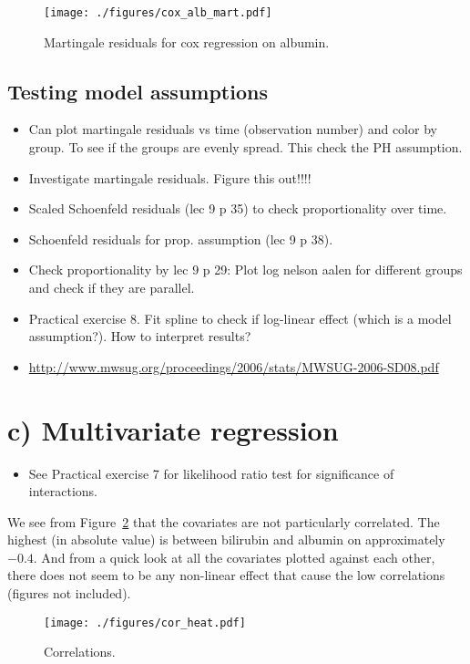 \documentclass[11pt,a4paper]{article}
\begin{document}
\begin{figure}[h!tb]
    \begin{center}
        \texttt{[image: ./figures/cox\_alb\_mart.pdf]}
    \end{center}
    \vspace{-0.2cm}
    \caption{Martingale residuals for cox regression on albumin.}
    \label{fig:cox_alb_mart}
\end{figure}


\subsection{Testing model assumptions}

\begin{itemize}
    \item Can plot martingale residuals vs time (observation number) and color by group. To see if the groups are evenly spread. This check the PH assumption.
    \item Investigate martingale residuals. Figure this out!!!!
    \item Scaled Schoenfeld residuals (lec 9 p 35) to check proportionality over time.
    \item Schoenfeld residuals for prop. assumption (lec 9 p 38).
    \item Check proportionality by lec 9 p 29: Plot log nelson aalen for different groups and check if they are parallel.
    \item Practical exercise 8. Fit spline to check if log-linear effect (which is a model assumption?). How to interpret results?
    \item \url{http://www.mwsug.org/proceedings/2006/stats/MWSUG-2006-SD08.pdf}
\end{itemize}



\section{c) Multivariate regression}
\begin{itemize}
    \item See Practical exercise 7 for likelihood ratio test for significance of interactions.
\end{itemize}


We see from Figure~\ref{fig:cor_heat} that the covariates are not particularly correlated. The highest (in absolute value) is between bilirubin and albumin on approximately $-0.4$. And from a quick look at all the covariates plotted against each other, there does not seem to be any non-linear effect that cause the low correlations (figures not included).
%
\begin{figure}[h!tb]
    \begin{center}
        \texttt{[image: ./figures/cor\_heat.pdf]}
    \end{center}
    \vspace{-0.8cm}
    \caption{Correlations.}
    \label{fig:cor_heat}
\end{figure}
\end{document}
